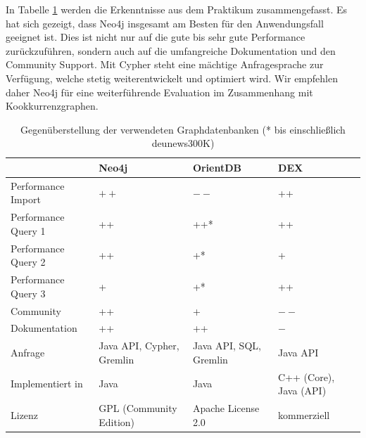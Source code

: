 \documentclass[11pt, a4paper, oneside]{article} %
\begin{document}
In Tabelle \ref{tab:compare} werden die Erkenntnisse aus dem Praktikum zusammengefasst. Es hat sich gezeigt, dass Neo4j insgesamt am Besten für den Anwendungsfall geeignet ist. Dies ist nicht nur auf die gute bis sehr gute Performance zurückzuführen, sondern auch auf die umfangreiche Dokumentation und den Community Support. Mit Cypher steht eine mächtige Anfragesprache zur Verfügung, welche stetig weiterentwickelt und optimiert wird. Wir empfehlen daher Neo4j für eine weiterführende Evaluation im Zusammenhang mit Kookkurrenzgraphen.

\renewcommand{\arraystretch}{1.5}

\begin{table}[ht]
\begin{tabular}{|l||p{2.5cm}|p{2.5cm}|p{2.5cm}|}
\hline 
 & \textbf{Neo4j} & \textbf{OrientDB} & \textbf{DEX} \\ 
\hline
Performance Import & $++$ & $--$ & ++ \\ 
\hline 
Performance Query 1 & ++ & ++* & ++ \\ 
\hline 
Performance Query 2 & ++ & +* & + \\ 
\hline 
Performance Query 3 & + & +* & ++ \\ 
\hline
Community & ++ & + & $--$ \\ 
\hline 
Dokumentation & ++ & ++ & $-$ \\
\hline 
Anfrage & Java API, Cypher, Gremlin & Java API, SQL, Gremlin & Java API \\
\hline
Implementiert in & Java & Java & C++ (Core), Java (API) \\
\hline 
Lizenz & GPL (Community Edition) & Apache License 2.0 & kommerziell	 \\ 
\hline 
\end{tabular}
\caption{Gegenüberstellung der verwendeten Graphdatenbanken (* bis einschließlich deu\textunderscore news\textunderscore 300K)}
\label{tab:compare}
\end{table}

\newpage
\end{document}
